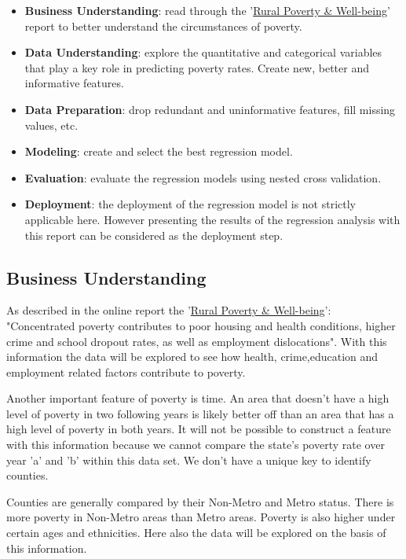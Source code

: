\documentclass[11pt]{article}
\providecommand{\tightlist}{%
      \setlength{\itemsep}{0pt}\setlength{\parskip}{0pt}}
\begin{document}
\begin{itemize}
\tightlist
\item
  \textbf{Business Understanding}: read through the
  '\href{https://www.ers.usda.gov/topics/rural-economy-population/rural-poverty-well-being/poverty-overview.aspx}{Rural
  Poverty \& Well-being}' report to better understand the circumstances
  of poverty.
\item
  \textbf{Data Understanding}: explore the quantitative and categorical
  variables that play a key role in predicting poverty rates. Create
  new, better and informative features.
\item
  \textbf{Data Preparation}: drop redundant and uninformative features,
  fill missing values, etc.
\item
  \textbf{Modeling}: create and select the best regression model.
\item
  \textbf{Evaluation}: evaluate the regression models using nested cross
  validation.
\item
  \textbf{Deployment}: the deployment of the regression model is not
  strictly applicable here. However presenting the results of the
  regression analysis with this report can be considered as the
  deployment step.
\end{itemize}

\subsection{Business Understanding}\label{business-understanding}

As described in the online report the
'\href{https://www.ers.usda.gov/topics/rural-economy-population/rural-poverty-well-being/poverty-overview.aspx}{Rural
Poverty \& Well-being}': "Concentrated poverty contributes to poor
housing and health conditions, higher crime and school dropout rates, as
well as employment dislocations". With this information the data will be
explored to see how health, crime,education and employment related
factors contribute to poverty.

Another important feature of poverty is time. An area that doesn't have
a high level of poverty in two following years is likely better off than
an area that has a high level of poverty in both years. It will not be
possible to construct a feature with this information because we cannot
compare the state's poverty rate over year 'a' and 'b' within this data
set. We don't have a unique key to identify counties.

Counties are generally compared by their Non-Metro and Metro status.
There is more poverty in Non-Metro areas than Metro areas. Poverty is
also higher under certain ages and ethnicities. Here also the data will
be explored on the basis of this information.
\end{document}
